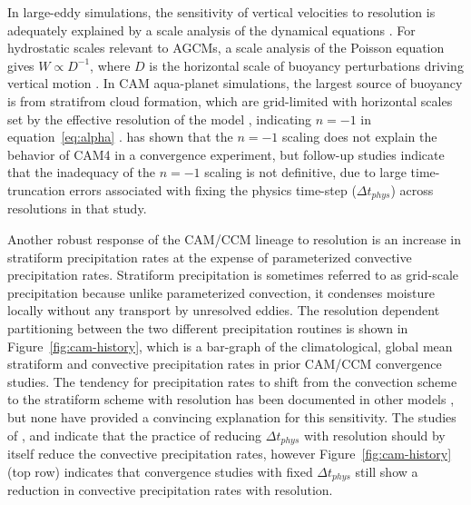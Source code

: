 \documentclass[times]{qjrms4}
\begin{document}
In large-eddy simulations, the sensitivity of vertical velocities to resolution is adequately explained by a scale analysis of the dynamical equations \citep{WETAL1997MWR,PG2006JAS,JR2016QJRMS}. For hydrostatic scales relevant to AGCMs, a scale analysis of the Poisson equation gives $W \propto D^{-1}$, where $D$ is the horizontal scale of buoyancy perturbations driving vertical motion \citep{HR2018JAMES}. In CAM aqua-planet simulations, the largest source of buoyancy is from stratifrom cloud formation, which are grid-limited with horizontal scales set by the effective resolution of the model \citep[i.e., some multiple of $\Delta x$;][]{S2011LNCSE}, indicating $n=-1$ in equation~\ref{eq:alpha} \citep{HR2018JAMES}. \cite{HR2017JCLIM} has shown that the $n=-1$ scaling does not explain the behavior of CAM4 in a convergence experiment, but follow-up studies \citep{HR2018JAMES,HETAL2019JAMES} indicate that the inadequacy of the $n=-1$ scaling is not definitive, due to large time-truncation errors associated with fixing the physics time-step ($\Delta t_{phys}$) across resolutions in that study.

Another robust response of the CAM/CCM lineage to resolution is an increase in stratiform precipitation rates at the expense of parameterized convective precipitation rates. Stratiform precipitation is sometimes referred to as grid-scale precipitation because unlike parameterized convection, it condenses moisture locally without any transport by unresolved eddies. The resolution dependent partitioning between the two different precipitation routines is shown in Figure~\ref{fig:cam-history}, which is a bar-graph of the climatological, global mean stratiform and convective precipitation rates in prior CAM/CCM convergence studies. The tendency for precipitation rates to shift from the convection scheme to the stratiform scheme with resolution has been documented in other models \citep{PS2002CD,RETAL2016CD,TETAL2018CD}, but none have provided a convincing explanation for this sensitivity. The studies of \cite{KW1991JGR}, \cite{WETAL1995CD} and \cite{W2013QJRMS} indicate that the practice of reducing $\Delta t_{phys}$ with resolution should by itself reduce the convective precipitation rates, however Figure~\ref{fig:cam-history} (top row) indicates that convergence studies with fixed $\Delta t_{phys}$ still show a reduction in convective precipitation rates with resolution.
\end{document}
